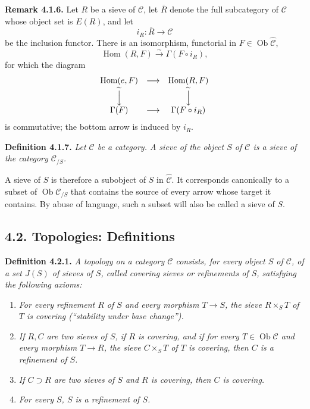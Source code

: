 \medskip
\noindent{}\textbf{Remark 4.1.6.}
Let \(R\) be a sieve of \(\mathscr C\), let \(\overline R\) denote the full
subcategory of \(\mathscr C\) whose object set is \(E(R)\), and let
\[
 i_R:\overline R\longrightarrow\mathscr C
\]
be the inclusion functor. There is an isomorphism, functorial in
\(F\in\operatorname{Ob}\widehat{\mathscr C}\),
\[
 \operatorname{Hom}(R,F)\xrightarrow{\sim}\Gamma(F\circ i_R),
\]
for which the diagram
\[
\begin{array}{ccc}
 \operatorname{Hom}(e,F)&\longrightarrow&\operatorname{Hom}(R,F)\\
 \overset{\sim}{\Big\downarrow}&&
 \overset{\sim}{\Big\downarrow}\\
 \Gamma(F)&\longrightarrow&\Gamma(F\circ i_R)
\end{array}
\]
is commutative; the bottom arrow is induced by \(i_R\).

\medskip
\noindent{}\textbf{Definition 4.1.7.}
\textit{Let \(\mathscr C\) be a category. A \emph{sieve of the object}
\(S\) of \(\mathscr C\) is a sieve of the category
\(\mathscr C_{/S}\).}

A sieve of \(S\) is therefore a subobject of \(S\) in
\(\widehat{\mathscr C}\). It corresponds canonically to a subset of
\(\operatorname{Ob}\mathscr C_{/S}\) that contains the source of every arrow
whose target it contains. By abuse of language, such a subset will also be
called a sieve of \(S\).

\subsection*{4.2. Topologies: Definitions}

\medskip
\noindent{}\textbf{Definition 4.2.1.}
\textit{A \emph{topology} on a category \(\mathscr C\) consists, for every
object \(S\) of \(\mathscr C\), of a set \(J(S)\) of sieves of \(S\), called
\emph{covering sieves} or \emph{refinements} of \(S\), satisfying the
following axioms:}
\begin{enumerate}
 \item[(T 1)] \textit{For every refinement \(R\) of \(S\) and every
 morphism \(T\to S\), the sieve \(R\times_ST\) of \(T\) is covering
 (``stability under base change'').}
 \item[(T 2)] \textit{If \(R,C\) are two sieves of \(S\), if \(R\) is
 covering, and if for every \(T\in\operatorname{Ob}\mathscr C\) and every
 morphism \(T\to R\), the sieve \(C\times_ST\) of \(T\) is covering, then
 \(C\) is a refinement of \(S\).}
 \item[(T 3)] \textit{If \(C\supset R\) are two sieves of \(S\) and
 \(R\) is covering, then \(C\) is covering.}
 \item[(T 4)] \textit{For every \(S\), \(S\) is a refinement of \(S\).}
\end{enumerate}

